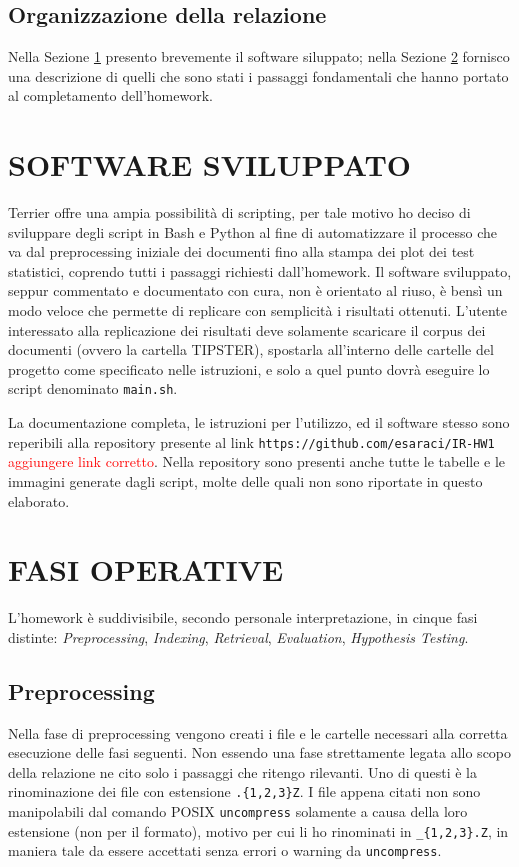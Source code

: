 \documentclass[letterpaper, 10 pt, conference]{ieeeconf}  %
\newcommand\todo[1]{\textcolor{red}{#1}}
\begin{document}
\subsection{Organizzazione della relazione}
Nella Sezione \ref{sec:sw} presento brevemente il software siluppato; nella Sezione \ref{sec:devops} fornisco una descrizione di quelli che sono stati i passaggi fondamentali che hanno portato al completamento dell'homework.

\section{SOFTWARE SVILUPPATO}\label{sec:sw}

Terrier offre una ampia possibilità di scripting, per tale motivo ho deciso di sviluppare degli script in Bash e Python al fine di automatizzare il processo che va dal preprocessing iniziale dei documenti fino alla stampa dei plot dei test statistici, coprendo tutti i passaggi richiesti dall'homework.
Il software sviluppato, seppur commentato e documentato con cura, non è orientato al riuso, è bensì un modo veloce che permette di replicare con semplicità i risultati ottenuti.
L'utente interessato alla replicazione dei risultati deve solamente scaricare il corpus dei documenti (ovvero la cartella TIPSTER), spostarla all'interno delle cartelle del progetto come specificato nelle istruzioni, e solo a quel punto dovrà eseguire lo script denominato \texttt{main.sh}.

La documentazione completa, le istruzioni per l'utilizzo, ed il software stesso sono reperibili alla repository presente al link \texttt{https://github.com/esaraci/IR-HW1} \todo{aggiungere link corretto}. Nella repository sono presenti anche tutte le tabelle e le immagini generate dagli script, molte delle quali non sono riportate in questo elaborato.

\section{FASI OPERATIVE}\label{sec:devops}
L'homework è suddivisibile, secondo personale interpretazione, in cinque fasi distinte: \textit{Preprocessing}, \textit{Indexing}, \textit{Retrieval}, \textit{Evaluation}, \textit{Hypothesis Testing}.
\subsection{Preprocessing}
Nella fase di preprocessing vengono creati i file e le cartelle necessari alla corretta esecuzione delle fasi seguenti. Non essendo una fase strettamente legata allo scopo della relazione ne cito solo i passaggi che ritengo rilevanti. Uno di questi è la rinominazione dei file con estensione \texttt{.\{1,2,3\}Z}. I file appena citati non sono manipolabili dal comando POSIX \texttt{uncompress} solamente a causa della loro estensione (non per il formato), motivo per cui li ho rinominati in \texttt{\_\{1,2,3\}.Z}, in maniera tale da essere accettati senza errori o warning da \texttt{uncompress}.
\end{document}

